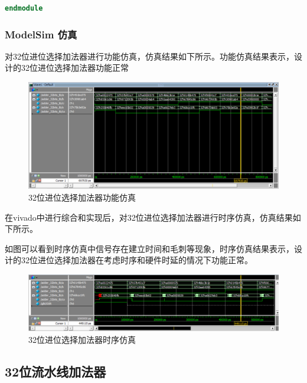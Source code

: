 \documentclass[12pt,hyperref,a4paper,UTF8]{ctexart}
\begin{document}
\begin{lstlisting}[language=Verilog]
endmodule


\end{lstlisting}

\subsubsection{ModelSim 仿真}

对32位进位选择加法器进行功能仿真，仿真结果如下所示。功能仿真结果表示，设计的32位进位选择加法器功能正常

  \begin{figure}[H]
      \centering
      \includegraphics[width =1.0\textwidth]{figures/fig/Snipaste_2024-09-23_09-00-59.png}
      \caption{32位进位选择加法器功能仿真}
      \label{fig:enter-label}
  \end{figure}

  在vivado中进行综合和实现后，对32位进位选择加法器进行时序仿真，仿真结果如下所示。

  如图可以看到时序仿真中信号存在建立时间和毛刺等现象，时序仿真结果表示，设计的32位进位选择加法器在考虑时序和硬件时延的情况下功能正常。


  \begin{figure}[H]
      \centering
      \includegraphics[width =1.0\textwidth]{figures/fig/Snipaste_2024-09-23_09-06-08.png}
      \caption{32位进位选择加法器时序仿真}
      \label{fig:enter-label}
  \end{figure}

  \newpage

\subsection{32位流水线加法器}
\end{document}

